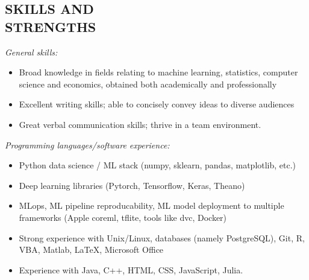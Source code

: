 \documentclass[margin]{res}
\begin{document}
\begin{resume}
		\section{SKILLS AND \\ STRENGTHS}
		{\it General skills:}\vspace{3mm}
		\begin{itemize}
			\item Broad knowledge in fields relating to machine learning, statistics, computer science and economics, obtained both academically and professionally
			\item Excellent writing skills; able to concisely convey ideas to diverse audiences
			\item Great verbal communication skills; thrive in a team environment.
		\end{itemize}
		{\it Programming languages/software experience:}\vspace{3mm}
		\begin{itemize}
			\item Python data science / ML stack (numpy, sklearn, pandas, matplotlib, etc.)
			\item Deep learning libraries (Pytorch, Tensorflow, Keras, Theano)
			\item MLops, ML pipeline reproducability, ML model deployment to multiple frameworks (Apple coreml, tflite, tools like dvc, Docker)
			\item Strong experience with Unix/Linux, databases (namely PostgreSQL), Git, R, VBA, Matlab, \LaTeX, Microsoft Office
			\item Experience with Java, C++, HTML, CSS, JavaScript, Julia.
		\end{itemize}
		
	\end{resume}
	
\end{document}
